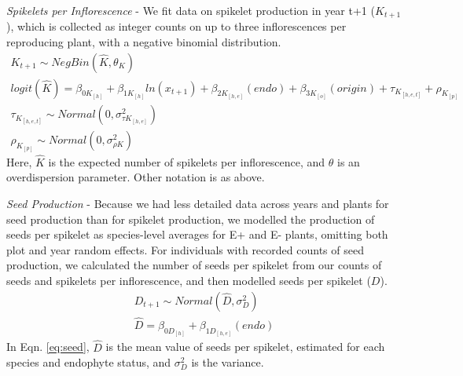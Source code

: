 \documentclass[12pt]{article}
\begin{document}
\emph{Spikelets per Inflorescence} - We fit data on spikelet production in year t+1 ($K_{t+1}$), which is collected as integer counts on up to three inflorescences per reproducing plant, with a negative binomial distribution. 
\begin{subequations} 
	\label{eq:spikelets}
	\begin{align}
		K_{t+1} \sim NegBin(\hat{K}, \theta_K) \\
		logit(\hat{K}) =  \beta_{0K_{[h]}} + \beta_{1K_{[h]}}ln(x_{t+1}) + \beta_{2K_{[h,e]}}(endo) + \beta_{3K_{[o]}}(origin) + \tau_{K_{[h,e,t]}} + \rho_{K_{[p]}} \\
		\tau_{K_{[h,e,t]}} \sim Normal(0, \sigma^2_{\tau K_{[h,e]}})\\
		\rho_{K_{[p]}} \sim Normal(0, \sigma^2_{\rho K})
	\end{align}
\end{subequations}
Here, $\hat{K}$ is the expected number of spikelets per inflorescence, and $\theta$ is an overdispersion parameter. Other notation is as above.  

\emph{Seed Production} - Because we had less detailed data across years and plants for seed production than for spikelet production, we modelled the production of seeds per spikelet as species-level averages for E+ and E- plants, omitting both plot and year random effects. For individuals with recorded counts of seed production, we calculated the number of seeds per spikelet from our counts of seeds and spikelets per inflorescence, and then modelled seeds per spikelet ($D$).
\begin{subequations} 
	\label{eq:seed}
	\begin{align}
		D_{t+1} \sim Normal(\hat{D}, \sigma^2_D) \\
		\hat{D} =  \beta_{0D_{[h]}} + \beta_{1D_{[h,e]}}(endo)
	\end{align}
\end{subequations}
In Eqn. \ref{eq:seed}, $\hat{D}$ is the mean value of seeds per spikelet, estimated for each species and endophyte status, and $\sigma^2_D$ is the variance.
\end{document}
